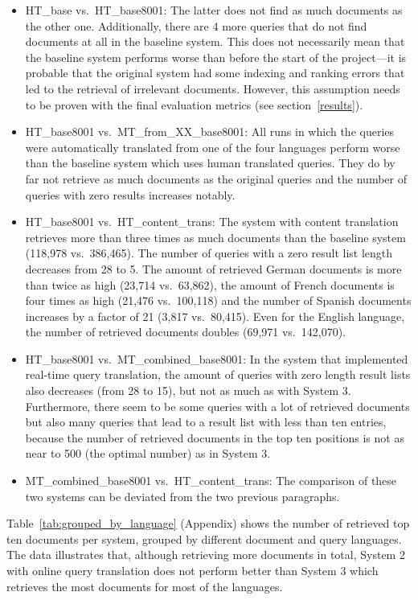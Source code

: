 \documentclass[a4paper,11pt]{article}
\begin{document}
\begin{itemize}
    \item HT\_base vs.\ HT\_base8001: The latter does not find as much documents as the other one. Additionally, there are 4 more queries that do not find documents at all in the baseline system. This does not necessarily mean that the baseline system performs worse than before the start of the project---it is probable that the original system had some indexing and ranking errors that led to the retrieval of irrelevant documents. However, this assumption needs to be proven with the final evaluation metrics (see section~\ref{results}).
    \item HT\_base8001 vs.\ MT\_from\_XX\_base8001: All runs in which the queries were automatically translated from one of the four languages perform worse than the baseline system which uses human translated queries. They do by far not retrieve as much documents as the original queries and the number of queries with zero results increases notably.
    \item HT\_base8001 vs.\ HT\_content\_trans: The system with content translation retrieves more than three times as much documents than the baseline system (118,978 vs.\ 386,465). The number of queries with a zero result list length decreases from 28 to 5. The amount of retrieved German documents is more than twice as high (23,714 vs.\ 63,862), the amount of French documents is four times as high (21,476 vs.\ 100,118) and the number of Spanish documents increases by a factor of 21 (3,817 vs.\ 80,415). Even for the English language, the number of retrieved documents doubles (69,971 vs.\ 142,070).
    \item HT\_base8001 vs.\ MT\_combined\_base8001: In the system that implemented real-time query translation, the amount of queries with zero length result lists also decreases (from 28 to 15), but not as much as with System 3. Furthermore, there seem to be some queries with a lot of retrieved documents but also many queries that lead to a result list with less than ten entries, because the number of retrieved documents in the top ten positions is not as near to 500 (the optimal number) as in System 3.
    \item MT\_combined\_base8001 vs.\ HT\_content\_trans: The comparison of these two systems can be deviated from the two previous paragraphs.
\end{itemize}

Table~\ref{tab:grouped_by_language} (Appendix) shows the number of retrieved top ten documents per system, grouped by different document and query languages. The data illustrates that, although retrieving more documents in total, System 2 with online query translation does not perform better than System 3 which retrieves the most documents for most of the languages. 
\end{document}
